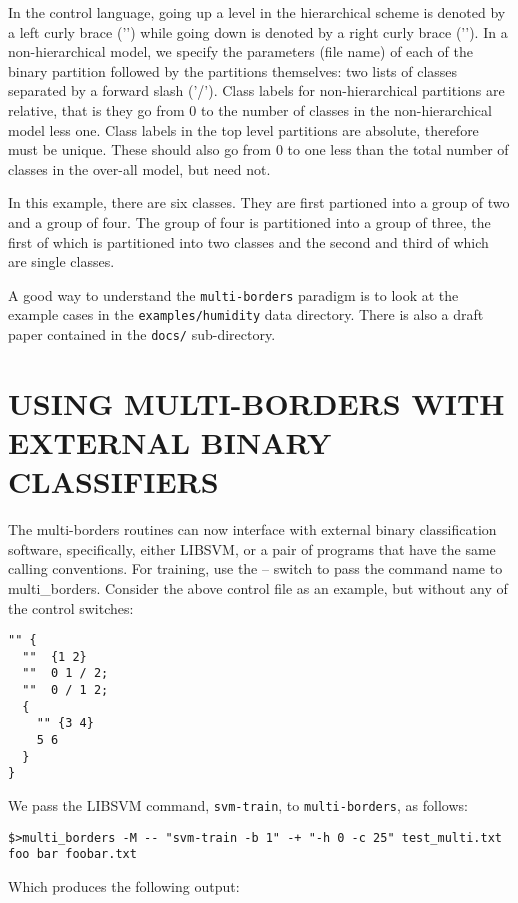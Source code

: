 \documentclass[12pt]{article}
\begin{document}
  In the control language, going up a level in the hierarchical scheme is denoted by a left curly brace ('{') while going down is denoted by a right curly brace ('}').  In a non-hierarchical model, we specify the parameters (file name) of each of the binary partition followed by the partitions themselves: two lists of classes separated by a forward slash ('/').  Class labels for non-hierarchical partitions are relative, that is they go from 0 to the number of classes in the non-hierarchical model less one.  Class labels in the top level partitions are absolute, therefore must be unique.  These should also go from 0 to one less than the total number of classes in the over-all model, but need not.

  In this example, there are six classes.  They are first partioned into a group of two and a group of four.  The group of four is partitioned into a group of three, the first of which is partitioned into two classes and the second and third of which are single classes.  

A good way to understand the \verb"multi-borders" paradigm is to look at the example cases in the \verb"examples/humidity" data directory.  There is also a draft paper contained in the \verb"docs/" sub-directory.


\section{USING MULTI-BORDERS WITH EXTERNAL BINARY CLASSIFIERS}

The multi-borders routines can now interface with external binary classification software, specifically, either LIBSVM, or a pair of programs that have the same calling conventions.  For training, use the -- switch to pass the command name to multi_borders.  Consider the above control file as an example, but without any of the control switches:

\begin{verbatim}
"" {
  ""  {1 2}
  ""  0 1 / 2;
  ""  0 / 1 2;
  {
    "" {3 4}
    5 6
  } 
} 
\end{verbatim}

We pass the LIBSVM command, \verb"svm-train", to \verb"multi-borders", as follows:

\begin{verbatim}
$>multi_borders -M -- "svm-train -b 1" -+ "-h 0 -c 25" test_multi.txt foo bar foobar.txt
\end{verbatim}

Which produces the following output:
\end{document}
